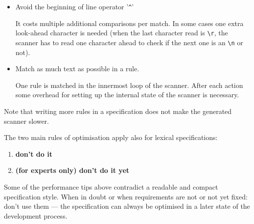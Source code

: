 \documentclass[11pt]{scrartcl}
\begin{document}
\begin{itemize}
  In the best case, the trailing context will first have to be read and 
  then (because it is not to be consumed) re-read again. The cases of 
  fixed-length look-ahead and fixed-length base expressions are handled efficiently
  by matching the concatenation and then pushing back the required amount
  of characters. This extends to the case of a disjunction of fixed-length
  look-ahead expressions such as \verb+r1 / \r|\n|\r\n+. All other cases
  \verb+r1 / r2+ are handled by first scanning the concatenation of 
  \verb+r1+ and \verb+r2+, and then finding the correct end of \verb+r1+. 
  The end of \verb+r1+ is found by scanning forwards in the match again,
  marking all possible \verb+r1+ terminations, and then scanning the reverse
  of \verb+r2+ backwards from the end until a start of \verb+r2+ intersects
  with an end of \verb+r1+. This algorithm is linear in the size of the input
  (not quadratic or worse as backtracking is), but about a factor of 2 slower 
  than normal scanning. It also consumes memory proportional to the size
  of the matched input for \verb+r1 r2+. 

\item
  Avoid the beginning of line operator '\verb+^+'
  
  It costs multiple additional comparisons per match. In some
  cases one extra look-ahead character is needed (when the last character read is
  \verb+\r+, the scanner has to read one character ahead to check if
  the next one is an \verb+\n+ or not).

\item
  Match as much text as possible in a rule.
  
  One rule is matched in the innermost loop of the scanner.  After
  each action some overhead for setting up the internal state of the
   scanner is necessary.
\end{itemize}

Note that writing more rules in a specification does not make the generated
scanner slower.

The two main rules of optimisation apply also for lexical specifications:
\begin{enumerate}
\item \textbf{don't do it}
\item \textbf{(for experts only) don't do it yet}
\end{enumerate}

Some of the performance tips above contradict a readable and compact
specification style. When in doubt or when requirements are not or not
yet fixed: don't use them --- the specification can always be optimised
in a later state of the development process.
\end{document}
